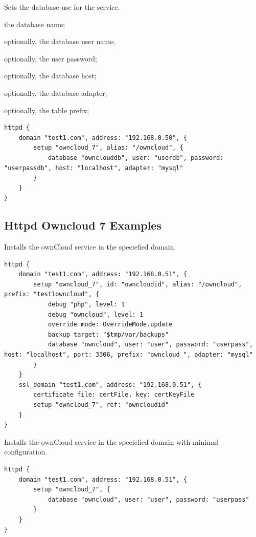 Sets the database use for the service.
\begin{asparaitem}
\item {} the database name;
\item {} optionally, the database user name;
\item {} optionally, the user password;
\item {} optionally, the database host;
\item {} optionally, the database adapter;
\item {} optionally, the table prefix;
\end{asparaitem}

\begin{lstlisting}[style=Java]
httpd {
    domain "test1.com", address: "192.168.0.50", {
        setup "owncloud_7", alias: "/owncloud", {
            database "ownclouddb", user: "userdb", password: "userpassdb", host: "localhost", adapter: "mysql"
        }
    }
}
\end{lstlisting}

\subsection{Httpd Owncloud 7 Examples}

Installs the ownCloud service in the speciefied domain.

\begin{lstlisting}[style=Sscontrol,
label={lst:owncloud_7_example_script_base},
title={Httpd.groovy}]
httpd {
    domain "test1.com", address: "192.168.0.51", {
        setup "owncloud_7", id: "owncloudid", alias: "/owncloud", prefix: "test1owncloud", {
            debug "php", level: 1
            debug "owncloud", level: 1
            override mode: OverrideMode.update
            backup target: "$tmp/var/backups"
            database "owncloud", user: "user", password: "userpass", host: "localhost", port: 3306, prefix: "owncloud_", adapter: "mysql"
        }
    }
    ssl_domain "test1.com", address: "192.168.0.51", {
        certificate file: certFile, key: certKeyFile
        setup "owncloud_7", ref: "owncloudid"
    }
}
\end{lstlisting}

Installs the ownCloud service in the speciefied domain with minimal configuration.

\begin{lstlisting}[style=Sscontrol,
label={lst:owncloud_7_example_script_minimal},
title={Httpd.groovy}]
httpd {
    domain "test1.com", address: "192.168.0.51", {
        setup "owncloud_7", {
            database "owncloud", user: "user", password: "userpass"
        }
    }
}
\end{lstlisting}

